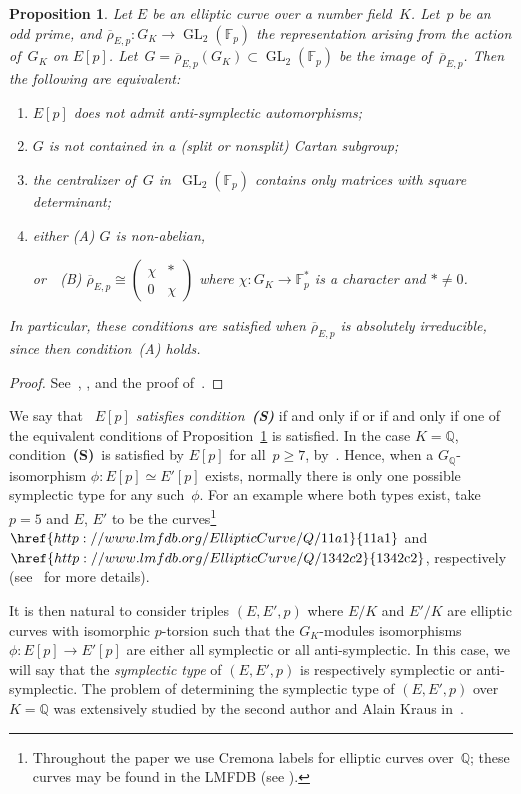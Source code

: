 \documentclass[12pt, reqno]{amsart}
\newcommand{\lmfdbec}[3]{\href{http://www.lmfdb.org/EllipticCurve/Q/#1#2#3}{{\text{\rm#1#2#3}}}}
\newcommand{\Fp}{\mathbb{F}_p}
\newcommand{\Fpstar}{\mathbb{F}_p^*}
\newcommand{\Q}{\mathbb{Q}}
\newcommand{\rhobar}{{\overline{\rho}}}
\newcommand{\GL}{\operatorname{GL}}
\numberwithin{equation}{section}
\newtheorem{proposition}[theorem]{Proposition}
\theoremstyle{definition}
\theoremstyle{remark}
\newcommand{\condS}{condition~{\bf (S)}}
\begin{document}
\begin{proposition} \label{P:conditionS}
Let $E$ be an elliptic curve over a number field~$K$. Let~$p$ be an
odd prime, and $\rhobar_{E,p} : G_K \to \GL_2(\Fp)$ the representation
arising from the action of~$G_K$ on $E[p]$.
Let~$G=\rhobar_{E,p}(G_K)\subset \GL_2(\Fp)$ be the image
of~$\rhobar_{E,p}$.  Then the following are equivalent:
\begin{enumerate}
\item $E[p]$ does not admit anti-symplectic automorphisms;
\item $G$ is not contained in a (split or nonsplit) Cartan subgroup;
\item the centralizer of~$G$ in~$\GL_2(\Fp)$ contains only matrices
  with square determinant;
\item either (A) $G$ is non-abelian,

  or\ \ (B) $\rhobar_{E,p} \cong \left( \begin{smallmatrix} \chi & * \\ 0 & \chi \end{smallmatrix} \right)$ where $\chi : G_K \to \Fpstar$ is a character
 and $* \neq 0$.
\end{enumerate}
In particular, these conditions are satisfied when $\rhobar_{E,p}$ is
absolutely irreducible, since then condition~(A) holds.
\end{proposition}
\begin{proof} See~\cite[Lemma~6]{FKSym}, \cite[Lemmas~7~and~8]{FKSym},
  and the proof of~\cite[Corollary~3]{FKSym}.
 \end{proof}

We say that \emph{~$E[p]$ satisfies \condS} if and only if or if and
only if one of the equivalent conditions of
Proposition~\ref{P:conditionS} is satisfied.  In the case $K=\Q$,
\condS\ is satisfied by $E[p]$ for all~$p\ge7$, by~\cite[Corollary~3
  and Proposition~2]{FKSym}.  Hence, when a $G_\Q$-isomorphism $\phi :
E[p] \simeq E'[p]$ exists, normally there is only one possible
symplectic type for any such~$\phi$.  For an example where both types
exist, take $p=5$ and $E$, $E'$ to be the curves\footnote{Throughout
  the paper we use Cremona labels for elliptic curves over~$\Q$; these
  curves may be found in the LMFDB (see \cite{lmfdb}).}
$\lmfdbec{11}{a}{1}$ and $\lmfdbec{1342}{c}{2}$, respectively
(see~\cite[Example~5.2]{FKSym} for more details).

It is then natural to consider triples $(E,E',p)$ where $E/K$ and
$E'/K$ are elliptic curves with isomorphic $p$-torsion such that the
$G_K$-modules isomorphisms $\phi : E[p] \rightarrow E'[p]$ are either
all symplectic or all anti-symplectic.  In this case, we will say that
the {\em symplectic type} of $(E,E',p)$ is respectively symplectic or
anti-symplectic.  The problem of determining the symplectic type of
$(E,E',p)$ over~$K=\Q$ was extensively studied by the second author
and Alain Kraus in~\cite{FKSym}.
\end{document}
